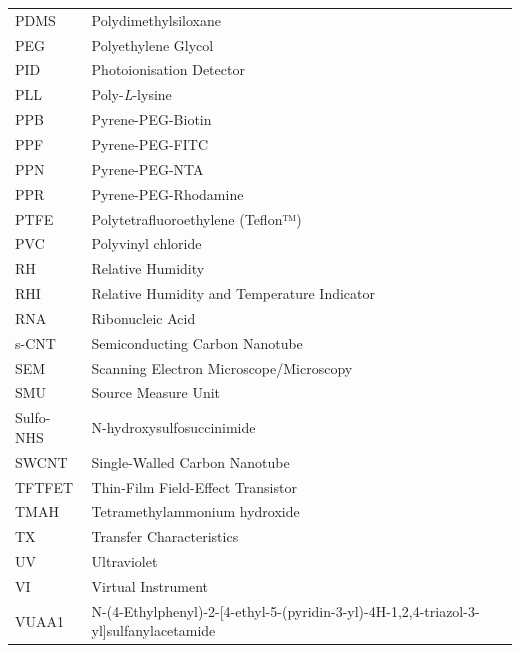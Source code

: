 \documentclass[
  a4paper,
]{scrbook}
\begin{document}
\newpage
\fancyhf{} %
\thispagestyle{fancy} %
\renewcommand{\headrulewidth}{0pt}
\fancyfoot[R]{\thepage} %
\begin{table}[H]
  \begin{tabular}{@{}p{} p{}@{}}  %
    PDMS  & Polydimethylsiloxane   \\  [5pt]
    PEG  & Polyethylene Glycol  \\[5pt] 
    PID  & Photoionisation Detector  \\[5pt] 
    PLL  & Poly-\textit{L}-lysine  \\[5pt]
    PPB  & Pyrene-PEG-Biotin  \\[5pt]
    PPF  & Pyrene-PEG-FITC  \\[5pt]
    PPN  & Pyrene-PEG-NTA  \\[5pt]
    PPR  & Pyrene-PEG-Rhodamine  \\[5pt]
    PTFE  & Polytetrafluoroethylene (Teflon™)  \\[5pt]
    PVC  & Polyvinyl chloride  \\[5pt]
    RH  & Relative Humidity  \\[5pt]
    RHI  & Relative Humidity and Temperature Indicator  \\[5pt] 
    RNA  & Ribonucleic Acid   \\[5pt]
    s-CNT  & Semiconducting Carbon Nanotube   \\[5pt]
    SEM  & Scanning Electron Microscope/Microscopy   \\[5pt]
    SMU  & Source Measure Unit   \\[5pt]
    Sulfo-NHS  & N-hydroxysulfosuccinimide   \\[5pt]
    SWCNT  & Single-Walled Carbon Nanotube   \\[5pt]
    TFTFET  & Thin-Film Field-Effect Transistor  \\[5pt]
    TMAH  & Tetramethylammonium hydroxide  \\[5pt]
    TX  & Transfer Characteristics  \\[5pt]
    UV  & Ultraviolet  \\[5pt]
    VI  & Virtual Instrument  \\[5pt]
    VUAA1  & N-(4-Ethylphenyl)-2-{[4-ethyl-5-(pyridin-3-yl)-4H-1,2,4-triazol-3-yl]sulfanyl}acetamide  \\[5pt] 
  \end{tabular}
\end{table}
\end{document}
